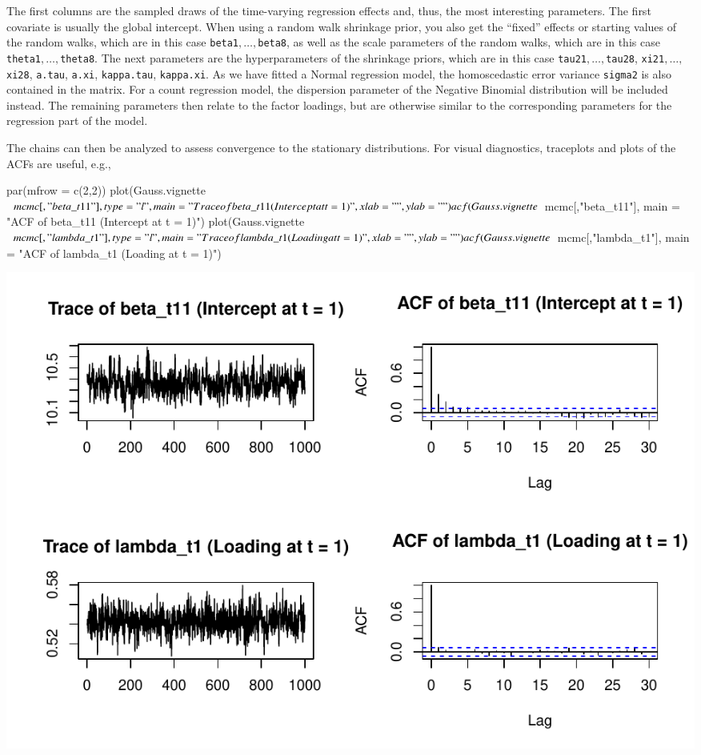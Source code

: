 \documentclass[a4paper, preprint, 3p,
authoryear]{elsarticle} %
\newenvironment{Shaded}{\begin{snugshade}}{\end{snugshade}}
\newcommand{\NormalTok}[1]{#1}
\newcommand{\pandocbounded}[1]{#1}
\begin{document}
The first columns are the sampled draws of the time-varying regression
effects and, thus, the most interesting parameters. The first covariate
is usually the global intercept. When using a random walk shrinkage
prior, you also get the ``fixed'' effects or starting values of the
random walks, which are in this case
\texttt{beta1}\(,\dots,\)\texttt{beta8}, as well as the scale parameters
of the random walks, which are in this case
\texttt{theta1}\(,\dots,\)\texttt{theta8}. The next parameters are the
hyperparameters of the shrinkage priors, which are in this case
\texttt{tau21}\(,\dots,\)\texttt{tau28},
\texttt{xi21}\(,\dots,\)\texttt{xi28}, \texttt{a.tau}, \texttt{a.xi},
\texttt{kappa.tau}, \texttt{kappa.xi}. As we have fitted a Normal
regression model, the homoscedastic error variance \texttt{sigma2} is
also contained in the matrix. For a count regression model, the
dispersion parameter of the Negative Binomial distribution will be
included instead. The remaining parameters then relate to the factor
loadings, but are otherwise similar to the corresponding parameters for
the regression part of the model.

The chains can then be analyzed to assess convergence to the stationary
distributions. For visual diagnostics, traceplots and plots of the ACFs
are useful, e.g.,

\begin{Shaded}
\begin{Highlighting}[]
\NormalTok{par(mfrow = c(2,2))}
\NormalTok{plot(Gauss.vignette$mcmc[,"beta\_t11"], type = "l", }
\NormalTok{     main = "Trace of beta\_t11 (Intercept at t = 1)", xlab = "", ylab = "")}
\NormalTok{acf(Gauss.vignette$mcmc[,"beta\_t11"],}
\NormalTok{    main = "ACF of beta\_t11 (Intercept at t = 1)")}
\NormalTok{plot(Gauss.vignette$mcmc[,"lambda\_t1"], type = "l", }
\NormalTok{     main = "Trace of lambda\_t1 (Loading at t = 1)", xlab = "", ylab = "")}
\NormalTok{acf(Gauss.vignette$mcmc[,"lambda\_t1"],}
\NormalTok{    main = "ACF of lambda\_t1 (Loading at t = 1)")}
\end{Highlighting}
\end{Shaded}

\pandocbounded{\includegraphics[keepaspectratio]{Vignette-for-panelTVP_files/figure-latex/unnamed-chunk-19-1.pdf}}
\end{document}
